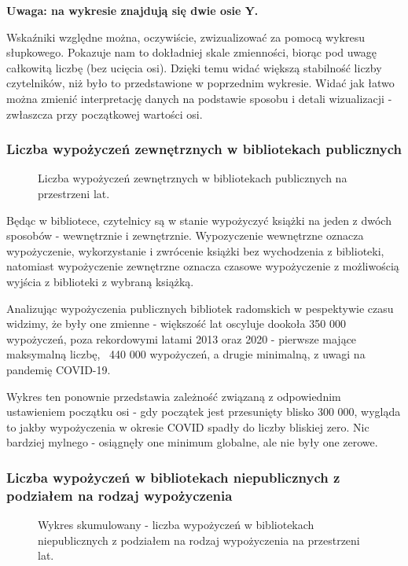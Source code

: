 \documentclass[12pt]{article}
\begin{document}
\textbf{Uwaga: na wykresie znajdują się dwie osie Y.}

Wskaźniki względne można, oczywiście, zwizualizować za pomocą wykresu słupkowego. Pokazuje nam to dokładniej skale zmienności, biorąc pod uwagę 
całkowitą liczbę (bez ucięcia osi). Dzięki temu widać większą stabilność liczby czytelników, niż było to przedstawione w poprzednim wykresie. 
Widać jak łatwo można zmienić interpretację danych na podstawie sposobu i detali wizualizacji - zwłaszcza przy początkowej wartości osi.



\subsubsection{Liczba wypożyczeń zewnętrznych w bibliotekach publicznych}
\begin{figure}[H]
    
    \caption{Liczba wypożyczeń zewnętrznych w bibliotekach publicznych na przestrzeni lat.}
\end{figure}

Będąc w bibliotece, czytelnicy są w stanie wypożyczyć książki na jeden z dwóch sposobów - wewnętrznie i zewnętrznie. Wypozyczenie wewnętrzne oznacza wypożyczenie, 
wykorzystanie i zwrócenie książki bez wychodzenia z biblioteki, natomiast wypożyczenie zewnętrzne oznacza czasowe wypożyczenie z możliwością wyjścia z biblioteki 
z wybraną książką. 

Analizując wypożyczenia publicznych bibliotek radomskich w pespektywie czasu widzimy, że były one zmienne - większość lat oscyluje dookoła 350 000 wypożyczeń, 
poza rekordowymi latami 2013 oraz 2020 - pierwsze mające maksymalną liczbę, ~440 000 wypożyczeń, a drugie minimalną, z uwagi na pandemię COVID-19. 

Wykres ten ponownie przedstawia zależność związaną z odpowiednim ustawieniem początku osi - gdy początek jest przesunięty blisko 300 000, wygląda to jakby 
wypożyczenia w okresie COVID spadły do liczby bliskiej zero. Nic bardziej mylnego - osiągnęły one minimum globalne, ale nie były one zerowe. 


\subsubsection{Liczba wypożyczeń w bibliotekach niepublicznych z podziałem na rodzaj wypożyczenia}
\begin{figure}[H]
    
    \caption{Wykres skumulowany - liczba wypożyczeń w bibliotekach niepublicznych z podziałem na rodzaj wypożyczenia
    na przestrzeni lat.}
\end{figure}
\end{document}
